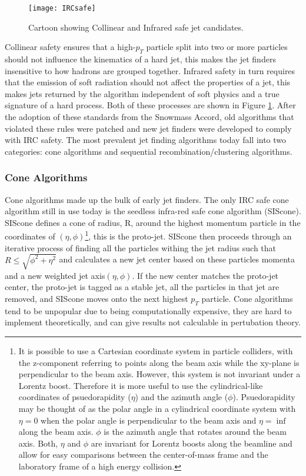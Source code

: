 \begin{figure}[h]
\texttt{[image: IRCsafe]}
\centering
\caption{Cartoon showing Collinear and Infrared safe jet candidates\cite{Blazey:2000qt}.}
\label{fig:IRCsafe}
\end{figure}


Collinear safety ensures that a high-$p_{T}$ particle split into two or more particles should not influence the kinematics of a hard jet, this makes the jet finders insensitive to how hadrons are grouped together.  Infrared safety in turn requires that the emission of soft radiation should not affect the properties of a jet, this makes jets returned by the algorithm independent of soft physics and a true signature of a hard process.  Both of these processes are shown in Figure \ref{fig:IRCsafe}. After the adoption of these standards from the Snowmass Accord, old algorithms that violated these rules were patched and new jet finders were developed to comply with IRC safety.  The most prevalent jet finding algorithms today fall into two categories: cone algorithms and sequential recombination/clustering algorithms.

\subsubsection{Cone Algorithms}

Cone algorithms made up the bulk of early jet finders.  The only IRC safe cone algorithm still in use today is the seedless infra-red safe cone algorithm (SIScone).  SIScone defines a cone of radius, R, around the highest momentum particle in the coordinates of $(\eta,\phi)$\footnote{It is possible to use a Cartesian coordinate system in particle colliders, with the z-component referring to points along the beam axis while the xy-plane is perpendicular to the beam axis.  However, this system is not invariant under a Lorentz boost.  Therefore it is more useful to use the cylindrical-like coordinates of psuedorapidity ($\eta$) and the azimuth angle ($\phi$). Psuedorapidity may be thought of as the polar angle in a cylindrical coordinate system with $\eta = 0$ when the polar angle is perpendicular to the beam axis and $\eta = \inf$ along the beam axis.  $\phi$ is the azimuth angle that rotates around the beam axis.  Both, $\eta$ and $\phi$ are invariant for Lorentz boosts along the beamline and allow for easy comparisons between the center-of-mass frame and the laboratory frame of a high energy collision.}, this is the proto-jet.  SIScone then proceeds through an iterative process of finding all the particles withing the jet radius such that $R \leq \sqrt{\phi^{2} + \eta^{2}}$ and calculates a new jet center based on these particles momenta and a new weighted jet axis$(\eta,\phi)$.  If the new center matches the proto-jet center, the proto-jet is tagged as a stable jet, all the particles in that jet are removed, and SIScone moves onto the next highest $p_{T}$ particle.  Cone algorithms tend to be unpopular due to being computationally expensive, they are hard to implement theoretically, and can give results not calculable in pertubation theory.

